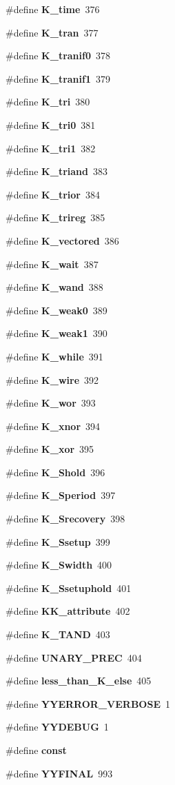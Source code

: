 \begin{CompactItemize}
\#define {\bf K\_\-time}\ 376
\item 
\#define {\bf K\_\-tran}\ 377
\item 
\#define {\bf K\_\-tranif0}\ 378
\item 
\#define {\bf K\_\-tranif1}\ 379
\item 
\#define {\bf K\_\-tri}\ 380
\item 
\#define {\bf K\_\-tri0}\ 381
\item 
\#define {\bf K\_\-tri1}\ 382
\item 
\#define {\bf K\_\-triand}\ 383
\item 
\#define {\bf K\_\-trior}\ 384
\item 
\#define {\bf K\_\-trireg}\ 385
\item 
\#define {\bf K\_\-vectored}\ 386
\item 
\#define {\bf K\_\-wait}\ 387
\item 
\#define {\bf K\_\-wand}\ 388
\item 
\#define {\bf K\_\-weak0}\ 389
\item 
\#define {\bf K\_\-weak1}\ 390
\item 
\#define {\bf K\_\-while}\ 391
\item 
\#define {\bf K\_\-wire}\ 392
\item 
\#define {\bf K\_\-wor}\ 393
\item 
\#define {\bf K\_\-xnor}\ 394
\item 
\#define {\bf K\_\-xor}\ 395
\item 
\#define {\bf K\_\-Shold}\ 396
\item 
\#define {\bf K\_\-Speriod}\ 397
\item 
\#define {\bf K\_\-Srecovery}\ 398
\item 
\#define {\bf K\_\-Ssetup}\ 399
\item 
\#define {\bf K\_\-Swidth}\ 400
\item 
\#define {\bf K\_\-Ssetuphold}\ 401
\item 
\#define {\bf KK\_\-attribute}\ 402
\item 
\#define {\bf K\_\-TAND}\ 403
\item 
\#define {\bf UNARY\_\-PREC}\ 404
\item 
\#define {\bf less\_\-than\_\-K\_\-else}\ 405
\item 
\#define {\bf YYERROR\_\-VERBOSE}\ 1
\item 
\#define {\bf YYDEBUG}\ 1
\item 
\#define {\bf const}
\item 
\#define {\bf YYFINAL}\ 993

\end{CompactItemize}
